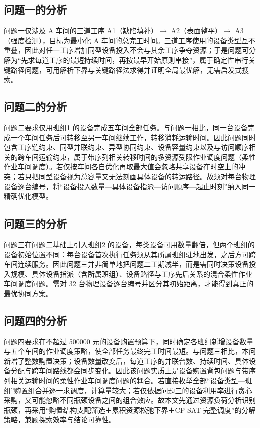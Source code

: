 \documentclass[12pt,a4paper]{article}
\begin{document}
\subsection{问题一的分析}

问题一仅涉及 A 车间的三道工序 A1（缺陷填补）$\to$ A2（表面整平）$\to$ A3（强度检测），目标为最小化 A 车间的总完工时间。三道工序使用的设备类型互不重叠，因此对任一工序增加同型设备投入不会与其余工序争夺资源；于是问题可分解为“先求每道工序的最短持续时间，再按最早开始原则串接”，属于确定性串行关键路径问题，可用解析下界与关键路径法求得并证明全局最优解，无需启发式搜索\cite{pinedo}。

\subsection{问题二的分析}

问题二要求仅用班组1 的设备完成五车间全部任务。与问题一相比，同一台设备完成一个车间任务后可转移至另一车间继续工作，转移消耗运输时间。因此问题同时包含工序链约束、同型并联约束、异型协同约束、设备容量约束以及与访问顺序相关的跨车间运输约束，属于带序列相关转移时间的多资源受限作业调度问题（柔性作业车间调度\cite{jobshop}）。若仅按车间各自优化再取最大值会忽略共享设备在时空上的冲突；若只把同型设备视为总容量又无法刻画具体设备的转运路径。故须对每台物理设备逐台编号，将“设备投入数量—具体设备指派—访问顺序—起止时刻”纳入同一精确优化模型。

\subsection{问题三的分析}

问题三在问题二基础上引入班组2 的设备，每类设备可用数量翻倍，但两个班组的设备初始位置不同：每台设备首次执行任务须从其所属班组驻地出发，之后方可跨车间连续服务。因此问题三并非简单地把问题二工期减半，而是需同时决策设备投入规模、具体设备指派（含所属班组）、设备路径与工序先后关系的混合柔性作业车间调度问题。需对 32 台物理设备逐台编号并区分其初始距离，才能得到真正的最优协同方案。

\subsection{问题四的分析}

问题四要求在不超过 500000 元的设备购置预算下，同时确定各班组新增设备数量与五个车间的作业调度策略，使全部任务最终完工时间最短。与问题三相比，本问新增了整数购置决策；设备数量改变后，每道工序的并联台数、持续时间、具体设备分配与跨车间路线都会同步变化。因此该问题实质上是设备购置背包问题与带序列相关运输时间的柔性作业车间调度问题的耦合。若直接枚举全部“设备类型—班组”购置组合并逐一求调度，计算量较大；若仅依据问题三的设备利用率进行贪心采购，又可能忽略不同瓶颈设备之间的组合效应。故本文先通过资源负荷分析识别瓶颈，再采用“购置结构支配筛选＋累积资源松弛下界＋CP-SAT 完整调度”的分解策略，兼顾探索效率与结论可靠性。
\end{document}
